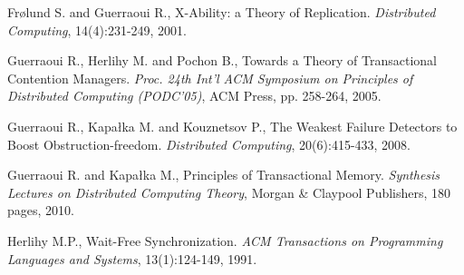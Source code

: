 \begin{thebibliography}{99}
{%




Fr{\o}lund S. and Guerraoui R.,
X-Ability: a Theory of Replication.
{\it Distributed Computing}, 14(4):231-249, 2001. 







Guerraoui R.,  Herlihy M. and  Pochon B., 
 Towards a Theory of Transactional Contention Managers. 
{\it  Proc. 24th  Int'l  ACM Symposium on Principles of  Distributed 
Computing (PODC'05)},  ACM Press, pp. 258-264,  2005. 







Guerraoui R., Kapa\l{}ka M. and  Kouznetsov P., 
The Weakest Failure Detectors to Boost Obstruction-freedom. 
{\it Distributed Computing}, 20(6):415-433, 2008. 


Guerraoui R. and  Kapa\l{}ka M.,
Principles of Transactional Memory. 
{\it Synthesis Lectures on Distributed Computing Theory},
 Morgan \& Claypool Publishers, 180 pages, 2010. 






Herlihy M.P., 
Wait-Free Synchronization. 
{\it ACM Transactions on Programming Languages and Systems}, 
13(1):124-149, 1991. 





}
\end{thebibliography}

